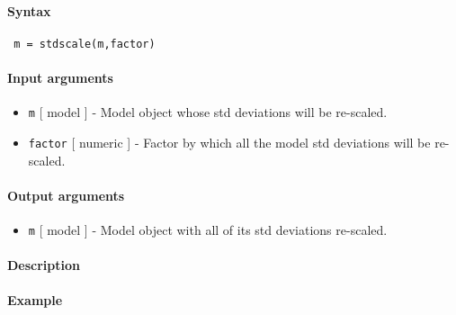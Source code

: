 


	\paragraph{Syntax}
 
 \begin{verbatim}
 m = stdscale(m,factor)
 \end{verbatim}
 
 \paragraph{Input arguments}
 
 \begin{itemize}
 \item
   \texttt{m} {[} model {]} - Model object whose std deviations will be
   re-scaled.
 \item
   \texttt{factor} {[} numeric {]} - Factor by which all the model std
   deviations will be re-scaled.
 \end{itemize}
 
 \paragraph{Output arguments}
 
 \begin{itemize}
 \item
   \texttt{m} {[} model {]} - Model object with all of its std deviations
   re-scaled.
 \end{itemize}
 
 \paragraph{Description}
 
 \paragraph{Example}


